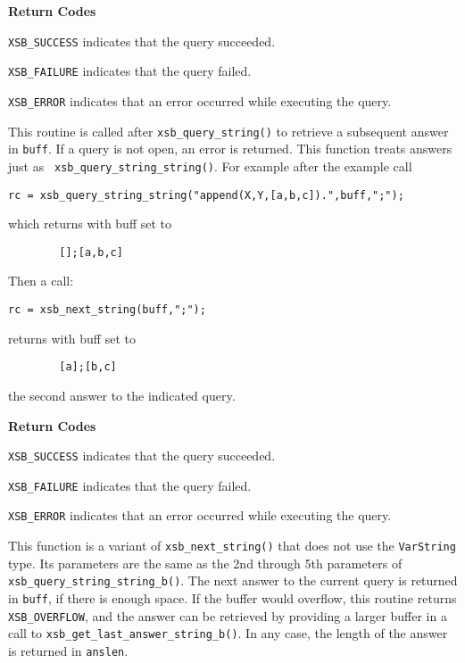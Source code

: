 \begin{description}
{\bf Return Codes}  
\bi
\item {\tt XSB\_SUCCESS} indicates that the query succeeded.
%
\item {\tt XSB\_FAILURE} indicates that the query failed.
%
\item {\tt XSB\_ERROR} indicates that an error occurred while
  executing the query.  
%
\ei

%
This routine is called after {\tt xsb\_query\_string()} to retrieve a
subsequent answer in {\tt buff}.  If a query is not open, an error is
returned.  This function treats answers just as {\tt
  xsb\_query\_string\_string()}.  For example after the example call
\begin{verbatim}
rc = xsb_query_string_string("append(X,Y,[a,b,c]).",buff,";");
\end{verbatim}
which returns with buff set to 
\begin{verbatim}
        [];[a,b,c]
\end{verbatim}
Then a call:
\begin{verbatim}
rc = xsb_next_string(buff,";");
\end{verbatim}
returns with buff set to 
\begin{verbatim}
        [a];[b,c]
\end{verbatim}
the second answer to the indicated query. 

{\bf Return Codes}  
\bi
\item {\tt XSB\_SUCCESS} indicates that the query succeeded.
%
\item {\tt XSB\_FAILURE} indicates that the query failed.
%
\item {\tt XSB\_ERROR} indicates that an error occurred while
  executing the query.  
%
\ei

  
%
This function is a variant of {\tt xsb\_next\_string()} that does not
use the {\tt VarString} type.  Its parameters are the same as the 2nd
through 5th parameters of {\tt xsb\_query\_string\_string\_b()}.  The
next answer to the current query is returned in \verb|buff|, if there
is enough space.  If the buffer would overflow, this routine returns
{\tt XSB\_OVERFLOW}, and the answer can be retrieved by providing a
larger buffer in a call to {\tt xsb\_get\_last\_answer\_string\_b()}.
In any case, the length of the answer is returned in \verb|anslen|.


\end{description}
